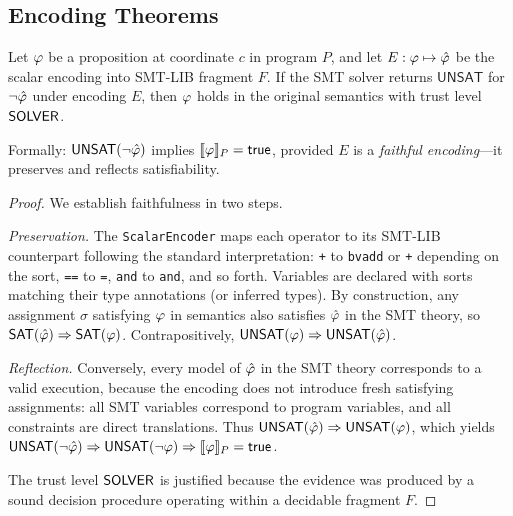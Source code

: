\subsection{Encoding Theorems}\label{sec:encoding-thms}

\begin{theorem}\label{thm:encoding-sound}
Let $\varphi$ be a proposition at coordinate $c$ in program $P$, and let
$E : \varphi \mapsto \hat{\varphi}$ be the scalar encoding into SMT-LIB
fragment $F$.  If the SMT solver returns $\mathsf{UNSAT}$ for
$\neg \hat{\varphi}$ under encoding $E$, then $\varphi$ holds in the
original \Python{} semantics with trust level $\mathsf{SOLVER}$.

Formally: $\mathsf{UNSAT}(\neg \hat{\varphi})$ implies
$\llbracket \varphi \rrbracket_P = \mathsf{true}$, provided $E$ is a
\emph{faithful encoding}---\ie it preserves and reflects satisfiability.
\end{theorem}

\begin{proof}
We establish faithfulness in two steps.

\emph{Preservation.}  The \texttt{ScalarEncoder} maps each \Python{}
operator to its SMT-LIB counterpart following the standard
interpretation: \texttt{+} to \texttt{bvadd} or \texttt{+} depending
on the sort, \texttt{==} to \texttt{=}, \texttt{and} to
\texttt{and}, and so forth.  Variables are declared with sorts
matching their \Python{} type annotations (or inferred types).
By construction, any assignment $\sigma$ satisfying $\varphi$ in
\Python{} semantics also satisfies $\hat{\varphi}$ in the SMT theory,
so $\mathsf{SAT}(\hat{\varphi}) \Rightarrow \mathsf{SAT}(\varphi)$.
Contrapositively,
$\mathsf{UNSAT}(\varphi) \Rightarrow \mathsf{UNSAT}(\hat{\varphi})$.

\emph{Reflection.}  Conversely, every model of $\hat{\varphi}$ in the
SMT theory corresponds to a valid \Python{} execution, because the
encoding does not introduce fresh satisfying assignments: all SMT
variables correspond to program variables, and all constraints are
direct translations.  Thus
$\mathsf{UNSAT}(\hat{\varphi}) \Rightarrow \mathsf{UNSAT}(\varphi)$,
which yields
$\mathsf{UNSAT}(\neg\hat{\varphi}) \Rightarrow
 \mathsf{UNSAT}(\neg\varphi) \Rightarrow
 \llbracket \varphi \rrbracket_P = \mathsf{true}$.

The trust level $\mathsf{SOLVER}$ is justified because the evidence was
produced by a sound decision procedure operating within a decidable
fragment $F$.
\end{proof}

